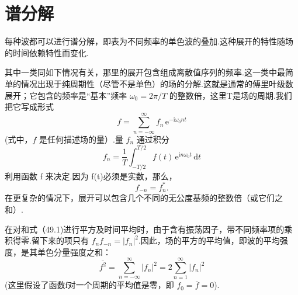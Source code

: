 \section{谱分解}

每种波都可以进行谱分解，即表为不同频率的单色波的叠加.这种展开的特性随场的时间依赖特性而变化.

其中一类同如下情况有关，那里的展开包含组成离散值序列的频率.这一类中最简单的情况出现于纯周期性（尽管不是单色）的场的分解.这就是通常的傅里叶级数展开；它包含的频率是“基本”频率 $\omega_0 = 2\pi/T$ 的整数倍，这里T是场的周期.我们把它写成形式
\begin{equation}
  f=\sum_{n=-\infty}^{\infty}f_n\,\mathrm{e}^{-\mathrm{i}\omega_0nt}
\end{equation}
(式中，$f$ 是任何描述场的量）.量 $f_n$ 通过积分
\begin{equation}
  f_n=\frac{1}{T}\int_{-T/2}^{T/2}f(t)\,\mathrm{e}^{\mathrm{i}n\omega_0t}\,\mathrm{d}t
\end{equation}
利用函数 f 来决定.因为 f(t)必须是实数，那么，
\begin{equation}
  f_{-n}=f_n^*.
\end{equation}
在更复杂的情况下，展开可以包含几个不同的无公度基频的整数倍（或它们之和）.

在对和式（49.1)进行平方及时间平均时，由于含有振荡因子，带不同频率项的乘积得零.留下来的项只有 $f_nf_{-n} = |f_n|^2$.因此，场的平方的平均值，即波的平均强度，是其单色分量强度之和：
\begin{equation}
  \overline{f^2}=\sum_{n=-\infty}^{\infty}|f_n|^2
  =2\sum_{n=1}^{\infty}|f_n|^2
\end{equation}
(这里假设了函数f对一个周期的平均值是零，即 $f_0 = \overline{f} = 0$).

